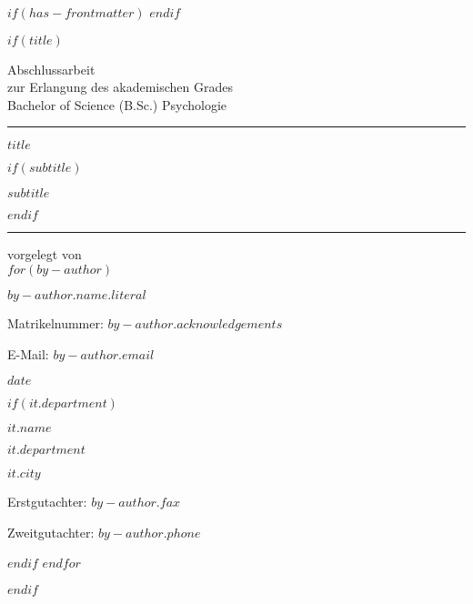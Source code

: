 $if(has-frontmatter)$
\frontmatter
$endif$

$if(title)$
\thispagestyle{empty}
{\centering
Abschlussarbeit \\
zur Erlangung des akademischen Grades \\
Bachelor of Science (B.Sc.) Psychologie \\
\vspace*{10mm}
\hrule
\vspace*{15mm}
{\large\bfseries $title$ \par}
$if(subtitle)$
{\large\bfseries $subtitle$ \par}
$endif$

\vspace*{15mm}
\hrule
\vspace*{10mm}
vorgelegt von  \\ 
$for(by-author)$
{\large\bfseries $by-author.name.literal$ \par}
\smallskip
{Matrikelnummer: $by-author.acknowledgements$ \par}
{E-Mail: $by-author.email$ \par}

\bigskip 

{\textmd\large $date$ \par}

$if(it.department)$
{\textmd\large $it.name$ \par}
{\textmd\large $it.department$ \par}
{\textmd\large $it.city$ \par}

\bigskip\bigskip\bigskip

{Erstgutachter: $by-author.fax$ \par}
{Zweitgutachter: $by-author.phone$ \par}
$endif$
$endfor$

\vspace*{10mm}


}
$endif$